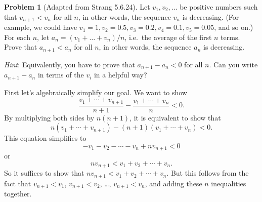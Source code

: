 \documentclass[11pt,oneside]{amsart}
\theoremstyle{definition}
\newtheorem{problem}{Problem}
\begin{document}
    \begin{problem}[Adapted from Strang 5.6.24]
        Let $v_1,v_2,\dots$ be positive numbers such that $v_{n+1}<v_n$ for all $n$, in other words, the sequence $v_n$ is decreasing. (For example, we could have $v_1=1, v_2=0.5, v_3=0.2, v_4=0.1, v_5=0.05$, and so on.) For each $n$, let $a_n=(v_1+\dots+v_n)/n$, i.e.\ the average of the first $n$ terms. Prove that $a_{n+1}<a_n$ for all $n$, in other words, the sequence $a_n$ is decreasing.

        \emph{Hint}: Equivalently, you have to prove that $a_{n+1}-a_n<0$ for all $n$. Can you write $a_{n+1}-a_n$ in terms of the $v_i$ in a helpful way?
    \end{problem}
    \begin{solution}
        First let's algebraically simplify our goal. We want to show
        \[\frac{v_1+\cdots+v_{n+1}}{n+1}-\frac{v_1+\cdots+v_n}n<0.\]
        By multiplying both sides by $n(n+1)$, it is equivalent to show that
        \[n(v_1+\cdots+v_{n+1})-(n+1)(v_1+\cdots+v_n)<0.\]
        This equation simplifies to
        \[-v_1-v_2-\cdots-v_n+nv_{n+1}<0\]
        or
        \[nv_{n+1}<v_1+v_2+\cdots+v_n.\]
        So it suffices to show that $nv_{n+1}<v_1+v_2+\cdots+v_n$. But this follows from the fact that $v_{n+1}<v_1$, $v_{n+1}<v_2$, \dots, $v_{n+1}<v_n$, and adding these $n$ inequalities together.
    \end{solution}
\end{document}
